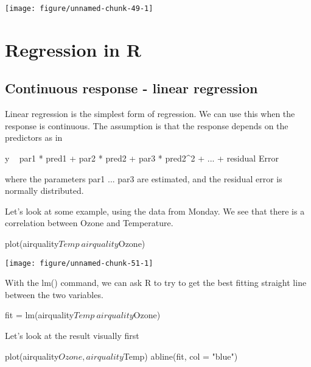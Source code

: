 \documentclass[a4paper,twoside]{tufte-book}\usepackage[]{graphicx}\usepackage[]{color}
\makeatletter
\def\maxwidth{ %
  \ifdim\Gin@nat@width>\linewidth
    \linewidth
  \else
    \Gin@nat@width
  \fi
}
\makeatother
\begin{document}
\begin{appendices}
\begin{Schunk}
{\centering \texttt{[image: figure/unnamed-chunk-49-1]} 

}

\end{Schunk}

\chapter{Regression in R}


\section{Continuous response - linear regression}

Linear regression is the simplest form of regression. We can use this when the response is continuous. The assumption is that the response depends on the predictors as in 

\begin{Schunk}
\begin{Sinput}
y ~ par1 * pred1 +  par2 * pred2 +  par3 * pred2^2 + ... + residual Error
\end{Sinput}
\end{Schunk}

where the parameters par1 ... par3 are estimated, and the residual error is normally distributed. 

Let's look at some example, using the data from Monday. We see that there is a correlation between Ozone and Temperature. 

\begin{Schunk}
\begin{Sinput}
plot(airquality$Temp~airquality$Ozone)
\end{Sinput}

\texttt{[image: figure/unnamed-chunk-51-1]} \end{Schunk}

With the lm() command, we can ask R to try to get the best fitting straight line between the two variables. 

\begin{Schunk}
\begin{Sinput}
fit = lm(airquality$Temp~airquality$Ozone)
\end{Sinput}
\end{Schunk}

Let's look at the result visually first

\begin{Schunk}
\begin{Sinput}
plot(airquality$Ozone, airquality$Temp)
abline(fit, col = "blue")
\end{Sinput}


\end{Schunk}
\end{appendices}
\end{document}

